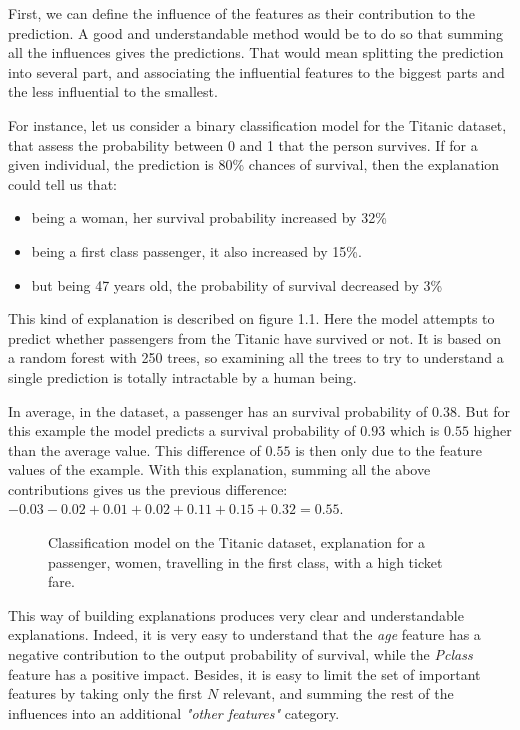 \documentclass[a4paper,11pt]{kth-mag}
\begin{document}
First, we can define the influence of the features as their contribution to the prediction. A good and understandable method would be to do so that summing all the influences gives the predictions. That would mean splitting the prediction into several part, and associating the influential features to the biggest parts and the less influential to the smallest.

For instance, let us consider a binary classification model for the Titanic dataset, that assess the probability between 0 and 1 that the person survives.
If for a given individual, the prediction is 80\% chances of survival, then the explanation could tell us that:

\begin{itemize}
\item being a woman, her survival probability increased by 32\%
\item being a first class passenger, it also increased by 15\%.
\item but being 47 years old, the probability of survival decreased by 3\%
\end{itemize}

This kind of explanation is described on figure 1.1. Here the model attempts to predict whether passengers from the Titanic have survived or not. It is based on a random forest with 250 trees, so examining all the trees to try to understand a single prediction is totally intractable by a human being.

In average, in the dataset, a passenger has an survival probability of $0.38$. But for this example the model predicts a survival probability of $0.93$ which is $0.55$ higher than the average value. This difference of $0.55$ is then only due to the feature values of the example. With this explanation, summing all the above contributions gives us the previous difference: $-0.03 - 0.02 + 0.01 + 0.02 + 0.11 + 0.15 + 0.32 = 0.55$.

\begin{figure}
    \centering
    \def\svgwidth{\columnwidth}
    
    \caption{Classification model on the Titanic dataset, explanation for a passenger, women, travelling in the first class, with a high ticket fare.}
\end{figure}

This way of building explanations produces very clear and understandable explanations. Indeed, it is very easy to understand that the \textit{age} feature has a negative contribution to the output probability of survival, while the \textit{Pclass} feature has a positive impact. Besides, it is easy to limit the set of important features by taking only the first $N$ relevant, and summing the rest of the influences into an additional \textit{"other features"} category.
\end{document}
